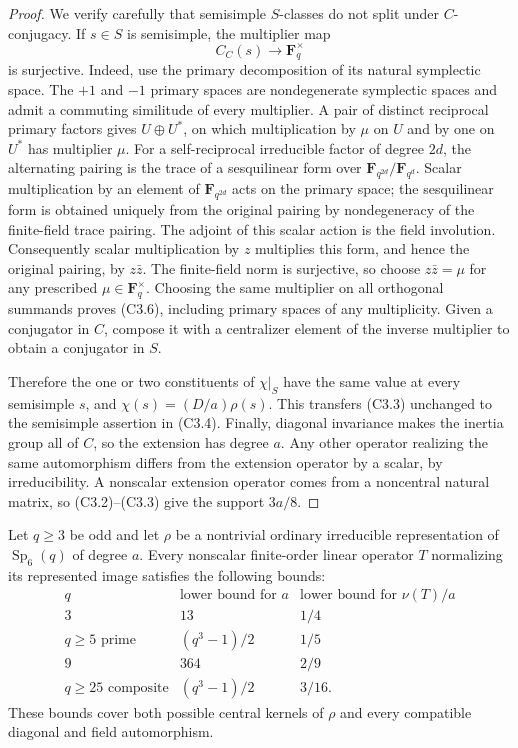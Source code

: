 \begin{proof}
We verify carefully that semisimple $S$-classes do not split under
$C$-conjugacy. If $s\in S$ is semisimple, the multiplier map
\[
              C_C(s)\longrightarrow\mathbf F_q^\times
                                                               \tag{C3.6}
\]
is surjective. Indeed, use the primary decomposition of its
natural symplectic space. The $+1$ and $-1$ primary spaces are
nondegenerate symplectic spaces and admit a commuting similitude
of every multiplier. A pair of distinct reciprocal primary factors
gives $U\oplus U^*$, on which multiplication by $\mu$ on $U$
and by one on $U^*$ has multiplier $\mu$. For a self-reciprocal
irreducible factor of degree $2d$, the alternating pairing is the
trace of a sesquilinear form over
$\mathbf F_{q^{2d}}/\mathbf F_{q^d}$. Scalar multiplication by
an element of $\mathbf F_{q^{2d}}$ acts on the primary space;
the sesquilinear form is obtained uniquely from the original
pairing by nondegeneracy of the finite-field trace pairing.
The adjoint of this scalar action is the field involution.
Consequently scalar multiplication by
$z$ multiplies this form, and hence the original pairing, by
$z\bar z$. The finite-field norm is surjective, so choose
$z\bar z=\mu$ for any prescribed $\mu\in\mathbf F_q^\times$.
Choosing the same multiplier on all orthogonal summands proves
(C3.6), including primary spaces of any multiplicity. Given a
conjugator in $C$, compose it with a centralizer element of the
inverse multiplier to obtain a conjugator in $S$.

Therefore the one or two constituents of $\chi|_S$ have the same
value at every semisimple $s$, and
$\chi(s)=(D/a)\rho(s)$. This transfers (C3.3) unchanged to the
semisimple assertion in (C3.4). Finally, diagonal invariance makes
the inertia group all of $C$, so the extension has degree $a$.
Any other operator realizing the same automorphism differs from
the extension operator by a scalar, by irreducibility. A nonscalar
extension operator comes from a noncentral natural matrix, so
(C3.2)--(C3.3) give the support $3a/8$.
\end{proof}

\begin{lemma}
\label{D-C3-02}
Let $q\ge3$ be odd and let $\rho$ be a nontrivial ordinary
irreducible representation of $\operatorname{Sp}_6(q)$ of degree
$a$. Every nonscalar finite-order linear operator $T$ normalizing
its represented image satisfies the following bounds:
\[
\begin{array}{c|c|c}
q&\text{lower bound for }a&\text{lower bound for }\nu(T)/a\\ \hline
3&13&1/4\\
q\ge5\text{ prime}&(q^3-1)/2&1/5\\
9&364&2/9\\
q\ge25\text{ composite}&(q^3-1)/2&3/16.
\end{array}                                                     \tag{C3.7}
\]
These bounds cover both possible central kernels of $\rho$ and
every compatible diagonal and field automorphism.
\end{lemma}

